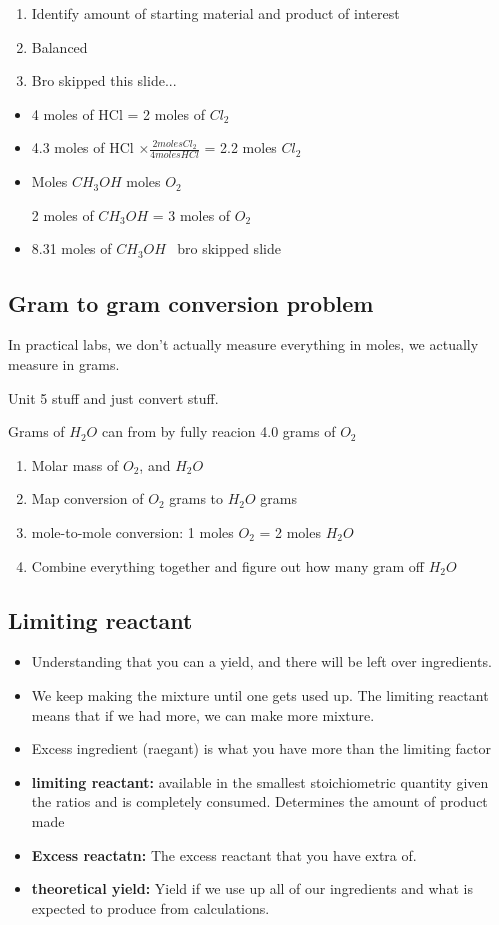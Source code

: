 \documentclass{article}
\begin{document}
\begin{enumerate}
  \item Identify amount of starting material and product of interest
  \item Balanced
  \item Bro skipped this slide...
\end{enumerate}


\begin{itemize}
  \item 4 moles of HCl = 2 moles of $Cl_2$
  \item 4.3 moles of HCl $\times{} \frac{2 moles Cl_2}{4 moles HCl} $ =  2.2 moles $Cl_2$
  \item Moles $CH_3OH$ \rightarrow{} moles $O_2$

    2 moles of $CH_3OH$ = 3 moles of $O_2$
  \item 8.31 moles of $CH_3OH$ \times{} $\frac{}{}$ bro skipped slide
\end{itemize}

\subsection{Gram to gram conversion problem}
In practical labs, we don't actually measure everything in moles, we actually measure in grams.

Unit 5 stuff and just convert stuff.

Grams of $H_2O$ can from by fully reacion 4.0 grams of $O_2$

\begin{enumerate}
  \item Molar mass of $O_2$, and $H_2O$
  \item Map conversion of $O_2$ grams to $H_2O$ grams
  \item mole-to-mole conversion: 1 moles $O_2$ = 2 moles $H_2O$
  \item Combine everything together and figure out how many gram off $H_2O$
\end{enumerate}

\subsection{Limiting reactant}
\begin{itemize}
  \item Understanding that you can a yield, and there will be left over ingredients.
  \item We keep making the mixture until one gets used up. The limiting reactant means that if we had more,
    we can make more mixture.
  \item Excess ingredient (raegant) is what you have more than the limiting factor
  \item \textbf{limiting reactant:} available in the smallest stoichiometric quantity given the ratios and is completely consumed.
    Determines the amount of product made
  \item \textbf{Excess reactatn:} The excess reactant that you have extra of.
  \item \textbf{theoretical yield:} Yield if we use up all of our ingredients and what is expected to produce from calculations.
\end{itemize}
\end{document}
